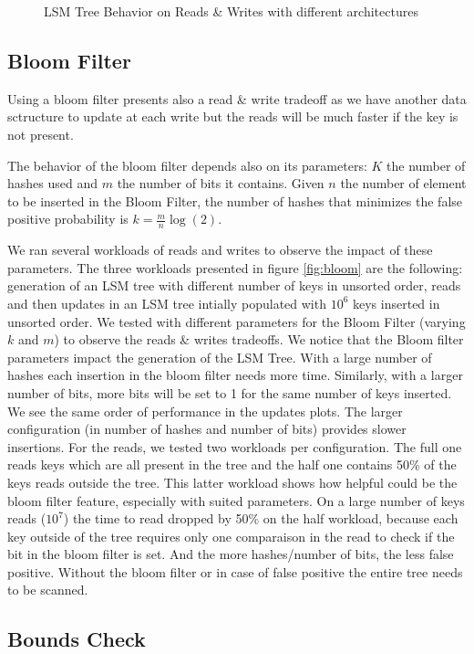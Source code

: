 \documentclass{sig-alternate-05-2015}
\begin{document}
\begin{figure}
\begin{minipage}[b]{0.32\textwidth}
  \end{minipage}
  \caption{LSM Tree Behavior on Reads \& Writes with different architectures}
  \label{fig:archi}
\end{figure}

\subsection{Bloom Filter}
Using a bloom filter presents also a read \& write tradeoff as we have another data sctructure to update at each write but the reads will be much faster if the key is not present.

The behavior of the bloom filter depends also on its parameters: $K$ the number of hashes used and $m$ the number of bits it contains. Given $n$ the number of element to be inserted in the Bloom Filter, the number of hashes that minimizes the false positive probability is $k = \frac{m}{n} \log(2)$.

We ran several workloads of reads and writes to observe the impact of these parameters. The three workloads presented in figure \ref{fig:bloom} are the following: generation of an LSM tree with different number of keys in unsorted order, reads and then updates in an LSM tree intially populated with $10^6$ keys inserted in unsorted order. We tested with different parameters for the Bloom Filter (varying $k$ and $m$) to observe the reads \& writes tradeoffs. We notice that the Bloom filter parameters impact the generation of the LSM Tree. With a large number of hashes each insertion in the bloom filter needs more time. Similarly, with a larger number of bits, more bits will be set to 1 for the same number of keys inserted. We see the same order of performance in the updates plots. The larger configuration (in number of hashes and number of bits) provides slower insertions. For the reads, we tested two workloads per configuration. The full one reads keys which are all present in the tree and the half one contains 50\% of the keys reads outside the tree. This latter workload shows how helpful could be the bloom filter feature, especially with suited parameters. On a large number of keys reads ($10^7$) the time to read dropped by 50\% on the half workload, because each key outside of the tree requires only one comparaison in the read to check if the bit in the bloom filter is set. And the more hashes/number of bits, the less false positive. Without the bloom filter or in case of false positive the entire tree needs to be scanned.

\subsection{Bounds Check}
\end{document}
